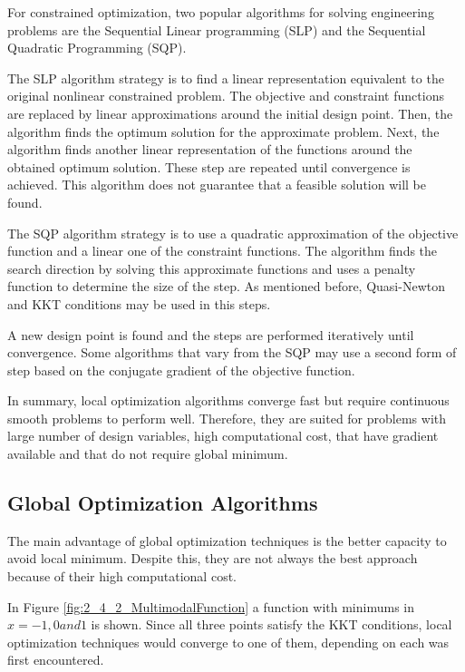 For constrained optimization, two popular algorithms for solving engineering problems are the Sequential Linear programming (SLP) and the Sequential Quadratic Programming (SQP).

The SLP algorithm strategy is to find a linear representation equivalent to the original nonlinear constrained problem. The objective and constraint functions are replaced by linear approximations around the initial design point. Then, the algorithm finds the optimum solution for the approximate problem. Next, the algorithm finds another linear representation of the functions around the obtained optimum solution. These step are repeated until convergence is achieved. This algorithm does not guarantee that a feasible solution will be found.

The SQP algorithm strategy is to use a quadratic approximation of the objective function and a linear one of the constraint functions. The algorithm finds the search direction by solving this approximate functions and uses a penalty function to determine the size of the step. As mentioned before, Quasi-Newton and KKT conditions may be used in this steps.

A new design point is found and the steps are performed iteratively until convergence. Some algorithms that vary from the SQP may use a second form of step based on the conjugate gradient of the objective function.

In summary, local optimization algorithms converge fast but require continuous smooth problems to perform well. Therefore, they are suited for problems with large number of design variables, high computational cost, that have gradient available and that do not require global minimum.

\subsection{Global Optimization Algorithms}

The main advantage of global optimization techniques is the better capacity to avoid local minimum. Despite this, they are not always the best approach because of their high computational cost.

In Figure \ref{fig:2_4_2_MultimodalFunction} a function with minimums in $x = -1, 0 and 1$ is shown. Since all three points satisfy the KKT conditions, local optimization techniques would converge to one of them, depending on each was first encountered.

